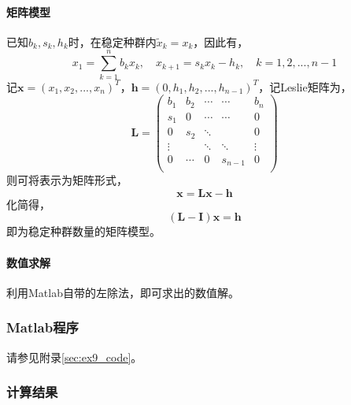 \documentclass[12pt,a4paper]{article}
\begin{document}
\paragraph{矩阵模型} 已知$b_k,s_k,h_k$时，在稳定种群内$\tilde{x}_k = x_k$，因此有，
\begin{equation}\label{eq:ex9_scalar}
    x_1 = \sum_{k=1}^n b_k x_k, \quad x_{k+1}=s_k x_k - h_k,\quad k=1,2,...,n-1
\end{equation}
记$\boldsymbol{x} = (x_1, x_2, ..., x_n)^T$，$\boldsymbol{h}=(0, h_1, h_2, ..., h_{n-1})^T$，记Leslie矩阵为，
\begin{equation}
    \boldsymbol{L} = \left(
    \begin{matrix}
        b_1     & b_2       & \cdots & \cdots & b_n \\
        s_1     & 0         & \cdots & \cdots & 0   \\
        0       & s_2       & \ddots &        & 0   \\
        \vdots  &           & \ddots & \ddots & \vdots \\
        0       & \cdots    & 0      & s_{n-1}& 0 \\
    \end{matrix}
    \right)
\end{equation}
则可将表示为矩阵形式，
\begin{equation}
    \boldsymbol{x} = \boldsymbol{Lx} - \boldsymbol{h}
\end{equation}
化简得，
\begin{equation}\label{eq:ex9_model}
    (\boldsymbol{L} - \boldsymbol{I})\boldsymbol{x} = \boldsymbol{h}
\end{equation}
即为稳定种群数量的矩阵模型。

\paragraph{数值求解} 利用Matlab自带的左除法，即可求出的数值解。

\subsubsection{Matlab程序}

请参见附录\ref{sec:ex9_code}。

\subsubsection{计算结果}
\end{document}
